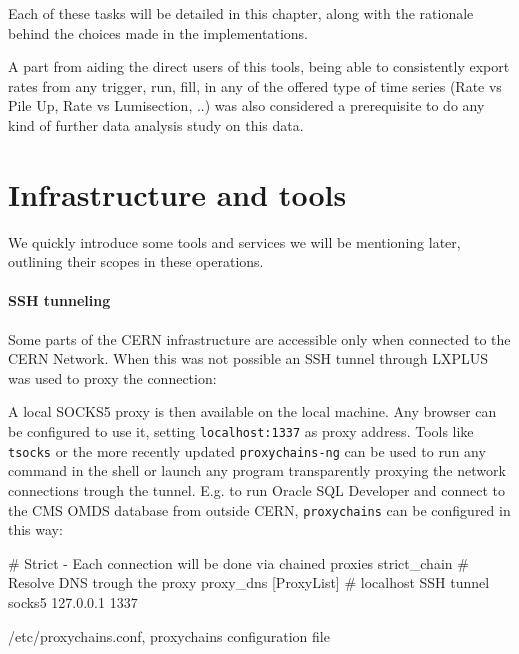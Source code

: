 Each of these tasks will be detailed in this chapter, along with the rationale behind the choices made in the implementations.

A part from aiding the direct users of this tools, being able to consistently export rates from any trigger, run, fill, in any of the offered type of time series (Rate vs Pile Up, Rate vs Lumisection, ..) was also considered a prerequisite to do any kind of further data analysis study on this data.

\section{Infrastructure and tools}

We quickly introduce some tools and services we will be mentioning later, outlining their scopes in these operations.

\paragraph{SSH tunneling}

Some parts of the CERN infrastructure are accessible only when connected to the CERN Network. When this was not possible an SSH tunnel through LXPLUS was used to proxy the connection:


A local SOCKS5 proxy is then available on the local machine. Any browser can be configured to use it, setting \texttt{localhost:1337} as proxy address. Tools like \texttt{tsocks} \cite{tsocksTransparentSOCKSProxyingLibrary-2020-10-07} or the more recently updated \texttt{proxychains-ng} \cite{proxychains-ng} can be used to run any command in the shell or launch any program transparently proxying the network connections trough the tunnel. E.g. to run Oracle SQL Developer and connect to the CMS OMDS database from outside CERN, \texttt{proxychains} can be configured in this way:

\begin{listing}[ht]
\begin{textcode}
# Strict - Each connection will be done via chained proxies
strict_chain
# Resolve DNS trough the proxy
proxy_dns
[ProxyList]
# localhost SSH tunnel
socks5  127.0.0.1 1337
\end{textcode}
\caption{/etc/proxychains.conf, proxychains configuration file}
\end{listing}

